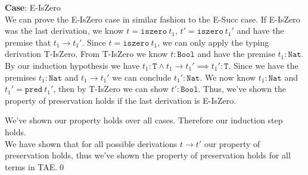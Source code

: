 \documentclass[12pt, fleqn]{article}
\begin{document}
\medskip
\textbf{Case}: E-IsZero\\
We can prove the E-IsZero case in similar fashion to the E-Succ case.
If E-IsZero was the last derivation, we know $t = \texttt{iszero}\:t_1$, $t' = \texttt{iszero}\:t_1'$ and have the
premise that $t_1 \rightarrow t_1'$. Since $t = \texttt{iszero}\:t_1$, we can only apply the typing derivation
T-IsZero. From T-IsZero we know $t : \texttt{Bool}$ and have the premise $t_1 : \texttt{Nat}$. By our induction
hypothesis we have $t_1 : \texttt{T} \land t_1 \rightarrow t_1' \implies t_1' : \texttt{T}$. Since we have the premises
$t_1 : \texttt{Nat}$ and $t_1 \rightarrow t_1'$ we can conclude $t_1' : \texttt{Nat}$. We now know $t_1 : \texttt{Nat}$
and $t_1' = \texttt{pred}\:t_1'$, then by T-IsZero we can show $t' : \texttt{Bool}$.
Thus, we've shown the property of preservation holds if the last derivation is E-IsZero.

\medskip
We've shown our property holds over all cases. Therefore our induction step holds.\\
We have shown that for all possible derivations $t \rightarrow t'$ our property of preservation holds, thus
we've shown the property of preservation holds for all terms in TAE.\qed
\end{document}
